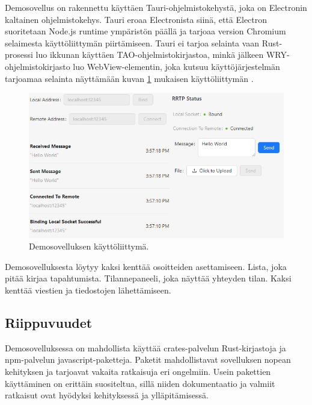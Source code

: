 \documentclass[a4paper,12pt]{article}
\begin{document}
    Demosovellus on rakennettu käyttäen Tauri-ohjelmistokehystä, joka on Electronin kaltainen ohjelmistokehys. Tauri eroaa Electronista siinä, että Electron suoritetaan Node.js runtime ympäristön päällä ja tarjoaa version Chromium selaimesta käyttöliittymän piirtämiseen. Tauri ei tarjoa selainta vaan Rust-prosessi luo ikkunan käyttäen TAO-ohjelmistokirjastoa, minkä jälkeen WRY-ohjelmistokirjasto luo WebView-elementin, joka kutsuu käyttöjärjestelmän tarjoamaa selainta näyttämään kuvan \ref{fig:demo_interface} mukaisen käyttöliittymän \cite{tauri-app}.

    \begin{figure}[h!]
        \centering
        
        \includegraphics[width=\textwidth]{doc/latex/src/images/RRTP.png}
        \caption{Demosovelluksen käyttöliittymä.}
        \label{fig:demo_interface}
    \end{figure}
    
    Demosovelluksesta löytyy kaksi kenttää osoitteiden asettamiseen. Lista, joka
    pitää kirjaa tapahtumista. Tilannepaneeli, joka näyttää yhteyden tilan.
    Kaksi kenttää viestien ja tiedostojen lähettämiseen. \par

    \subsection{Riippuvuudet}
    Demosovelluksessa on mahdollista käyttää crates-palvelun Rust-kirjastoja ja npm-palvelun javascript-paketteja. Paketit mahdollistavat sovelluksen nopean kehityksen ja tarjoavat vakaita ratkaisuja eri ongelmiin. Usein pakettien käyttäminen on erittäin suositeltua, sillä niiden dokumentaatio ja valmiit ratkaisut ovat hyödyksi kehityksessä ja ylläpitämisessä.
\end{document}
